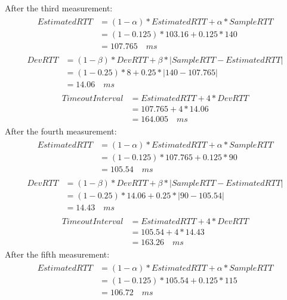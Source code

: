 \documentclass[titlepage, paper=a4, fontsize=11pt]{scrartcl} %
\numberwithin{equation}{section} %
\numberwithin{table}{section} %
\begin{document}
After the third measurement:
\begin{align*} 
\begin{split}
EstimatedRTT &= (1-\alpha)*EstimatedRTT + \alpha * SampleRTT \\
&= (1-0.125)*103.16 + 0.125 * 140 \\
&= 107.765 \quad ms
\end{split}					
\end{align*}
\begin{align*} 
\begin{split}
DevRTT &= (1-\beta)*DevRTT + \beta * | SampleRTT - EstimatedRTT | \\
&= (1-0.25)*8 + 0.25 * | 140 - 107.765 | \\
&= 14.06 \quad ms
\end{split}					
\end{align*}
\begin{align*} 
\begin{split}
TimeoutInterval &= EstimatedRTT + 4*DevRTT \\
&= 107.765 + 4*14.06 \\
&= 164.005 \quad ms
\end{split}					
\end{align*}
After the fourth measurement:
\begin{align*} 
\begin{split}
EstimatedRTT &= (1-\alpha)*EstimatedRTT + \alpha * SampleRTT \\
&= (1-0.125)*107.765 + 0.125 * 90 \\
&= 105.54 \quad ms
\end{split}					
\end{align*}
\begin{align*} 
\begin{split}
DevRTT &= (1-\beta)*DevRTT + \beta * | SampleRTT - EstimatedRTT | \\
&= (1-0.25)*14.06 + 0.25 * | 90 - 105.54 | \\
&= 14.43 \quad ms
\end{split}					
\end{align*}
\begin{align*} 
\begin{split}
TimeoutInterval &= EstimatedRTT + 4*DevRTT \\
&= 105.54 + 4*14.43 \\
&= 163.26 \quad ms
\end{split}					
\end{align*}
After the fifth measurement:
\begin{align*} 
\begin{split}
EstimatedRTT &= (1-\alpha)*EstimatedRTT + \alpha * SampleRTT \\
&= (1-0.125)*105.54 + 0.125 * 115 \\
&= 106.72 \quad ms
\end{split}					
\end{align*}
\end{document}
